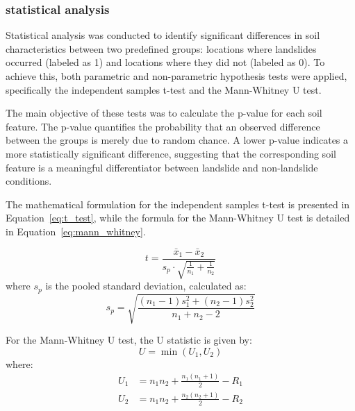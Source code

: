 \subsubsection{statistical analysis}
Statistical analysis was conducted to identify significant differences in soil characteristics between two predefined groups: locations where landslides occurred (labeled as 1) and locations where they did not (labeled as 0). To achieve this, both parametric and non-parametric hypothesis tests were applied, specifically the independent samples t-test and the Mann-Whitney U test\cite{mthd04}.

The main objective of these tests was to calculate the p-value for each soil feature. The p-value quantifies the probability that an observed difference between the groups is merely due to random chance. A lower p-value indicates a more statistically significant difference, suggesting that the corresponding soil feature is a meaningful differentiator between landslide and non-landslide conditions.

The mathematical formulation for the independent samples t-test is presented in Equation~\ref{eq:t_test}, while the formula for the Mann-Whitney U test is detailed in Equation~\ref{eq:mann_whitney}.

\begin{equation} \label{eq:t_test}
t = \frac{\bar{x}_1 - \bar{x}_2}{s_p \cdot \sqrt{\frac{1}{n_1} + \frac{1}{n_2}}}
\end{equation}
where $s_p$ is the pooled standard deviation, calculated as:
\begin{equation} \label{eq:sp_pooled}
s_p = \sqrt{\frac{(n_1 - 1)s_1^2 + (n_2 - 1)s_2^2}{n_1 + n_2 - 2}}
\end{equation}

For the Mann-Whitney U test, the U statistic is given by:
\begin{equation} \label{eq:mann_whitney}
U = \min(U_1, U_2)
\end{equation}
where:
\begin{align}
U_1 &= n_1n_2 + \frac{n_1(n_1 + 1)}{2} - R_1 \label{eq:U1} \\
U_2 &= n_1n_2 + \frac{n_2(n_2 + 1)}{2} - R_2 \label{eq:U2}
\end{align}
